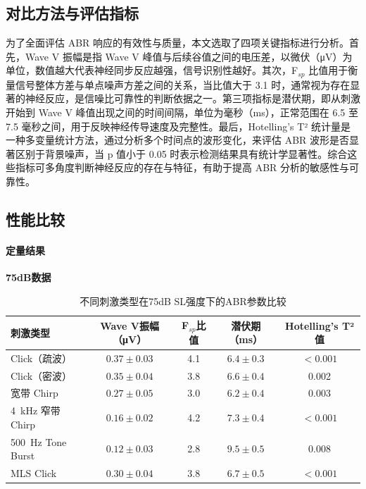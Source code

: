 \subsection*{对比方法与评估指标}
为了全面评估 ABR 响应的有效性与质量，本文选取了四项关键指标进行分析。首先，Wave V 振幅是指 Wave V 峰值与后续谷值之间的电压差，以微伏（μV）为单位，数值越大代表神经同步反应越强，信号识别性越好。其次，F$_{sp}$ 比值用于衡量信号整体方差与单点噪声方差之间的关系，当比值大于 3.1 时，通常视为存在显著的神经反应，是信噪比可靠性的判断依据之一。第三项指标是潜伏期，即从刺激开始到 Wave V 峰值出现之间的时间间隔，单位为毫秒（ms），正常范围在 6.5 至 7.5 毫秒之间，用于反映神经传导速度及完整性。最后，Hotelling's T² 统计量是一种多变量统计方法，通过分析多个时间点的波形变化，来评估 ABR 波形是否显著区别于背景噪声，当 p 值小于 0.05 时表示检测结果具有统计学显著性。综合这些指标可多角度判断神经反应的存在与特征，有助于提高 ABR 分析的敏感性与可靠性。

\subsection*{性能比较}
\paragraph*{定量结果}
\textbf{75dB数据}

\begin{table}[H]
\centering
\caption{不同刺激类型在75dB SL强度下的ABR参数比较}
\label{tab:75dbstimulus_comparisonParameter}
\begin{tabular}{lcccc}
\toprule
\textbf{刺激类型} & \textbf{Wave V振幅（\si{\micro V}）} & \textbf{F$_{sp}$比值} & \textbf{潜伏期（ms）} & \textbf{Hotelling's T²值} \\
\midrule
Click（疏波） & $0.37 \pm 0.03$ & 4.1 & $6.4 \pm 0.3$ & $<0.001$ \\
Click（密波） & $0.35 \pm 0.04$ & 3.8 & $6.6 \pm 0.4$ & 0.002 \\
宽带 Chirp & $0.27 \pm 0.05$ & 3.0 & $6.2 \pm 0.4$ & 0.003 \\
\SI{4}{kHz} 窄带 Chirp & $0.16 \pm 0.02$ & 4.2 & $7.3 \pm 0.4$ & $<0.001$ \\
\SI{500}{Hz} Tone Burst & $0.12 \pm 0.03$ & 2.8 & $9.5 \pm 0.5$ & 0.008 \\
MLS Click & $0.30 \pm 0.04$ & 3.8 & $6.7 \pm 0.5$ & $<0.001$ \\
\bottomrule
\end{tabular}
\end{table}

